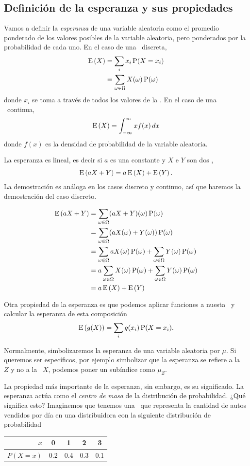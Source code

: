 \formal
\subsection{Definición de la esperanza y sus propiedades}
Vamos a definir la \emph{esperanza} de una variable aleatoria como el promedio ponderado de los valores posibles de la variable aleatoria, pero ponderados por la probabilidad de cada uno. En el caso de una \va\ discreta, \begin{align*}\operatorname{E}\left(X\right) &= \sum_{i} x_i \operatorname{P}(X=x_i)\\
  &=\sum_{\omega \in \Omega}X(\omega)\operatorname{P}(\omega)\end{align*} donde \(x_i\) se toma a través de todos los valores de la \va. En el caso de una \va\ continua, \[\operatorname{E}\left(X\right) = \int_{-\infty}^{\infty} x f(x)\mathop{dx}\] donde \(f(x)\) es la densidad de probabilidad de la variable aleatoria.

La esperanza es lineal, es decir si \(a\) es una constante y \(X\) e \(Y\) son dos \va, \[\operatorname{E}\left(aX+Y\right) = a\operatorname{E}\left(X\right)+\operatorname{E}\left(Y\right).\] La demostración es análoga en los casos discreto y continuo, así que haremos la demostración del caso discreto.

\begin{align*}
  \operatorname{E}\left(aX+Y\right) &= \sum_{\omega \in \Omega} (aX+Y)(\omega)\operatorname{P}(\omega)\\
&= \sum_{\omega \in \Omega} (aX(\omega)+Y(\omega))\operatorname{P}(\omega)\\
&= \sum_{\omega \in \Omega} aX(\omega)\operatorname{P}(\omega) + \sum_{\omega \in \Omega}Y(\omega)\operatorname{P}(\omega)\\
&= a\sum_{\omega \in \Omega} X(\omega)\operatorname{P}(\omega) + \sum_{\omega \in \Omega}Y(\omega)\operatorname{P}(\omega)\\
&= a\operatorname{E}\left(X\right) + \operatorname{E}\left(Y\right)
\end{align*}

Otra propiedad de la esperanza es que podemos aplicar funciones a nuesta \va\ y calcular la esperanza de esta composición \[\operatorname{E}\left(g(X)\right)= \sum_{i} g(x_i)\operatorname{P}(X=x_i).\]

\informal
Normalmente, simbolizaremos la esperanza de una variable aleatoria por \(\mu\). Si queremos ser específicos, por ejemplo simbolizar que la esperanza se refiere a la \va\ \(Z\) y no a la \va\ \(X\), podemos poner un subíndice como \(\mu_{Z}\).

La propiedad más importante de la esperanza, sin embargo, es su significado. La esperanza actúa como el \emph{centro de masa} de la distribución de probabilidad. ¿Qué significa esto? Imaginemos que tenemos una \va\ que representa la cantidad de autos vendidos por día en una distribuidora con la siguiente distribución de probabilidad
\begin{center}
  \begin{tabular}{rSSSS}
    \(x\) & 0 & 1 & 2 & 3 \\
    \midrule
    \(P(X=x)\) & 0.2 & 0.4 & 0.3 & 0.1 \\
  \end{tabular}
\end{center}

